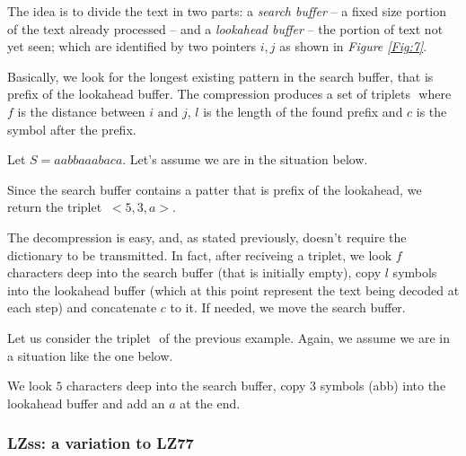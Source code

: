 \documentclass{subfiles}
\begin{document}
    The idea is to divide the text in two parts: 
        a \emph{search buffer} -- a fixed size portion of the text already processed --
        and a \emph{lookahead buffer} -- the portion of text not yet seen;
        which are identified by two pointers \(i, j\) as shown in \emph{Figure \ref{Fig:7}}.
        
        
        Basically, we look for the longest existing pattern in the search buffer,
        that is prefix of the lookahead buffer.
    The compression produces a set of triplets \(<f, l, c>\) where 
        \(f\) is the distance between \(i \text{ and } j\),
        \(l\) is the length of the found prefix and \(c\) is the symbol after the prefix.

        \begin{example*}
            Let \(S = aabbaaabaca\). Let's assume we are in the situation below.
                   
            
            \noindent Since the search buffer contains a patter that is prefix of the lookahead,
                we return the triplet \(\ <5, 3, a>\).
        \end{example*}

    The decompression is easy, and, as stated previously, 
        doesn't require the dictionary to be transmitted.
        In fact, after reciveing a triplet, 
        we look \(f\) characters deep into the search buffer (that is initially empty),
        copy \(l\) symbols into the lookahead buffer 
            (which at this point represent the text being decoded at each step) and 
            concatenate \(c\) to it.
        If needed, we move the search buffer.

        \begin{example*}
            Let us consider the triplet \(<5, 3, a>\) of the previous example.
            Again, we assume we are in a situation like the one below. 
                
            
            \noindent We look \(5\) characters deep into the search buffer, 
                copy \(3\) symbols (abb) into the lookahead buffer and add an \(a\) at the end.
        \end{example*}

    \subsubsection{LZss: a variation to LZ77}
    
\end{document}
